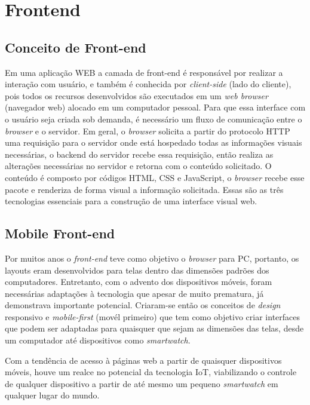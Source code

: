 \documentclass[../../layout.tex]{subfiles}
\begin{document}
\section{Frontend}
\subsection{Conceito de Front-end}
\hspace*{3em}Em uma aplicação WEB a camada de front-end é responsável por realizar a interação com usuário, e  também é conhecida por \emph{client-side} (lado do cliente), pois todos os recursos desenvolvidos são executados em um \emph{web browser} (navegador web) alocado em um computador pessoal. Para que essa interface com o usuário seja criada sob demanda, é necessário um fluxo de comunicação entre o \emph{browser} e o servidor. Em geral, o \emph{browser} solicita a partir do protocolo HTTP uma requisição para o servidor onde está hospedado todas as informações visuais necessárias, o backend do servidor recebe essa requisição, então realiza as alterações necessárias no servidor e retorna com o conteúdo solicitado. O conteúdo é composto por códigos HTML, CSS e JavaScript, o \emph{browser} recebe esse pacote e renderiza de forma visual a informação solicitada. Essas são as três tecnologias essenciais para a construção de uma interface visual web.\cite{frontend}

\subsection{Mobile Front-end}
\hspace*{3em}Por  muitos anos o \emph{front-end} teve como objetivo o \emph{browser} para PC, portanto, os layouts eram desenvolvidos para telas dentro das dimensões padrões dos computadores. Entretanto, com o advento dos dispositivos móveis, foram necessárias adaptações à tecnologia que apesar de muito prematura, já demonstrava importante potencial. Criaram-se então os conceitos de \emph{design} responsivo e \emph{mobile-first} (movél primeiro) que tem como objetivo criar interfaces que podem ser adaptadas para quaisquer que sejam as dimensões das telas, desde um computador até dispositivos como \emph{smartwatch}.\par
Com a tendência de acesso à páginas web a partir de quaisquer dispositivos móveis, houve um realce no potencial da tecnologia IoT, viabilizando o controle de qualquer dispositivo a partir de até mesmo um pequeno \emph{smartwatch} em qualquer lugar do mundo.\cite{mobilefrontend}
\end{document}
